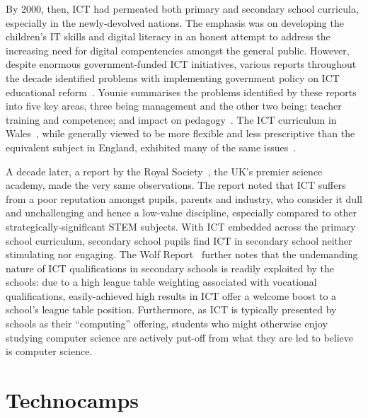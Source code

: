 \documentclass{sig-alternate}
\begin{document}
By 2000, then, ICT had permeated both primary and secondary school
curricula, especially in the newly-devolved nations. The emphasis was
on developing the children's IT skills and digital literacy in an
honest attempt to address the increasing need for digital
compentencies amongst the general public.  However, despite enormous
government-funded ICT initiatives, various reports throughout the
decade identified problems with implementing government policy on ICT
educational
reform~\cite{OpieFukuyo:2000,Ofsted:2001,Ofsted:2002,Ofsted:2004,
Loveless:2005}. Younie summarises the problems identified by these
reports into five key areas, three being management and the other two
being: teacher training and competence; and impact on
pedagogy~\cite{Younie:2006}. The ICT curriculum in
Wales~\cite{welshictcurric:2008}, while generally viewed to be more
flexible and less prescriptive than the equivalent subject in England,
exhibited many of the same issues~\cite{estynict:2014}.

A decade later, a report by the Royal Society~\cite{RoyalSoc:2012},
the UK's premier science academy, made the very same observations.
The report noted that ICT suffers from a poor reputation amongst
pupils, parents and industry, who consider it dull and unchallenging
and hence a low-value discipline, especially compared to other
strategically-significant STEM subjects.  With ICT embedded across the
primary school curriculum, secondary school pupils find ICT in
secondary school neither stimulating nor engaging. The Wolf
Report~\cite{Wolf:2011} further notes that the undemanding nature of
ICT qualifications in secondary schools is readily exploited by the
schools: due to a high league table weighting associated with
vocational qualifications, easily-achieved high results in ICT offer a
welcome boost to a school's league table position. Furthermore, as ICT
is typically presented by schools as their ``computing'' offering,
students who might otherwise enjoy studying computer science are
actively put-off from what they are led to believe is computer
science.

\section{Technocamps}
\end{document}

